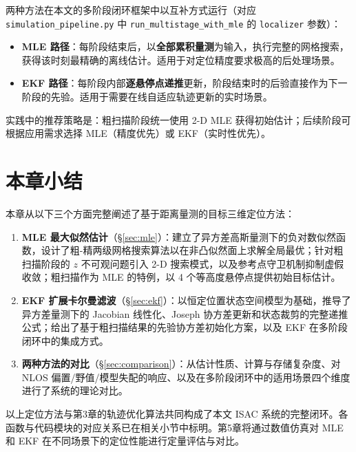 两种方法在本文的多阶段闭环框架中以互补方式运行（对应 \texttt{simulation\_pipeline.py} 中 \texttt{run\_multistage\_with\_mle} 的 \texttt{localizer} 参数）：

\begin{itemize}
    \item \textbf{MLE 路径}：每阶段结束后，以\textbf{全部累积量测}为输入，执行完整的网格搜索，获得该时刻最精确的离线估计。适用于对定位精度要求极高的后处理场景。
    \item \textbf{EKF 路径}：每阶段内部\textbf{逐悬停点递推}更新，阶段结束时的后验直接作为下一阶段的先验。适用于需要在线自适应轨迹更新的实时场景。
\end{itemize}

实践中的推荐策略是：粗扫描阶段统一使用 2-D MLE 获得初始估计；后续阶段可根据应用需求选择 MLE（精度优先）或 EKF（实时性优先）。


\section{本章小结}
\label{sec:summary_ch4}

本章从以下三个方面完整阐述了基于距离量测的目标三维定位方法：

\begin{enumerate}
    \item \textbf{MLE 最大似然估计}（\S\ref{sec:mle}）：建立了异方差高斯量测下的负对数似然函数，设计了粗-精两级网格搜索算法以在非凸似然面上求解全局最优；针对粗扫描阶段的 $z$ 不可观问题引入 2-D 搜索模式，以及参考点守卫机制抑制虚假收敛；粗扫描作为 MLE 的特例，以 4 个等高度悬停点提供初始目标估计。
    \item \textbf{EKF 扩展卡尔曼滤波}（\S\ref{sec:ekf}）：以恒定位置状态空间模型为基础，推导了异方差量测下的 Jacobian 线性化、Joseph 协方差更新和状态裁剪的完整递推公式；给出了基于粗扫描结果的先验协方差初始化方案，以及 EKF 在多阶段闭环中的集成方式。
    \item \textbf{两种方法的对比}（\S\ref{sec:comparison}）：从估计性质、计算与存储复杂度、对 NLOS 偏置/野值/模型失配的响应、以及在多阶段闭环中的适用场景四个维度进行了系统的理论对比。
\end{enumerate}

以上定位方法与第3章的轨迹优化算法共同构成了本文 ISAC 系统的完整闭环。各函数与代码模块的对应关系已在相关小节中标明。第5章将通过数值仿真对 MLE 和 EKF 在不同场景下的定位性能进行定量评估与对比。

